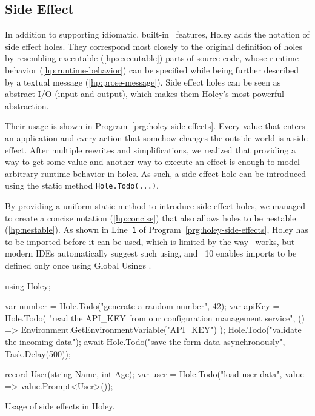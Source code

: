 \subsection{Side Effect}
\label{sec:hole-type-side-effect}
In addition to supporting idiomatic, built-in \CS\ features, Holey adds the notation of side effect holes.
They correspond most closely to the original definition of holes by resembling executable (\ref{hp:executable}) parts of source code, whose runtime behavior (\ref{hp:runtime-behavior}) can be specified while being further described by a textual message (\ref{hp:prose-message}).
Side effect holes can be seen as abstract I/O (input and output), which makes them Holey's most powerful abstraction.

Their usage is shown in Program~\ref{prg:holey-side-effects}.
Every value that enters an application and every action that somehow changes the outside world is a side effect.
After multiple rewrites and simplifications, we realized that providing a way to get some value and another way to execute an effect is enough to model arbitrary runtime behavior in holes.
As such, a side effect hole can be introduced using the static method \verb|Hole.Todo(...)|.

By providing a uniform static method to introduce side effect holes, we managed to create a concise notation (\ref{hp:concise}) that also allows holes to be nestable (\ref{hp:nestable}).
As shown in Line~\verb|1| of Program~\ref{prg:holey-side-effects}, Holey has to be imported before it can be used, which is limited by the way \CS\ works, but modern IDEs automatically suggest such using, and \CS\ 10 enables imports to be defined only once using Global Usings \cite{koch_global_2021}.

\begin{program}[ht]
\begin{CsCode}
using Holey;

var number = Hole.Todo("generate a random number", 42);
var apiKey = Hole.Todo(
	"read the API_KEY from our configuration management service",
	() => Environment.GetEnvironmentVariable("API_KEY")
);
Hole.Todo("validate the incoming data");
await Hole.Todo("save the form data asynchronously", Task.Delay(500));

record User(string Name, int Age);
var user = Hole.Todo("load user data", value => value.Prompt<User>());
\end{CsCode}
\caption{Usage of side effects in Holey.}
\label{prg:holey-side-effects}
\end{program}

